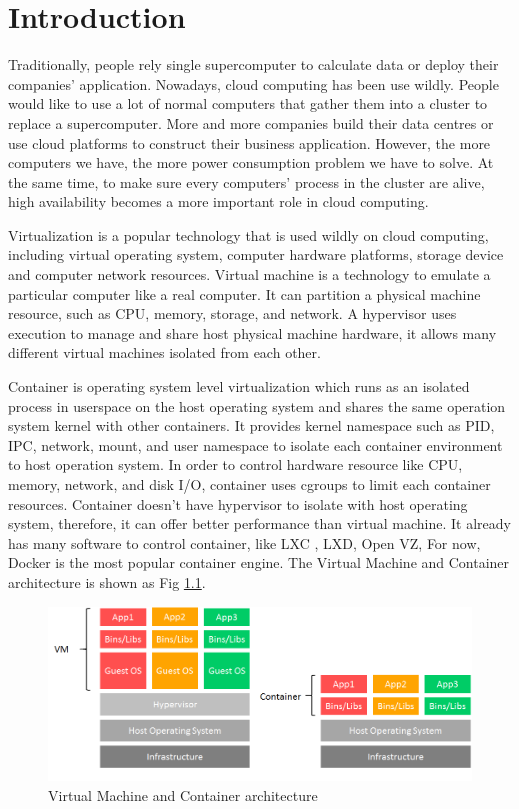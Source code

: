 \chapter{Introduction}
\label{chap:intro}
Traditionally, people rely single supercomputer to calculate data or deploy their companies' application. Nowadays, cloud computing has been use wildly. People would like to use a lot of normal computers that gather them into a cluster to replace a supercomputer. More and more companies build their data centres or use cloud platforms to construct their business application.
However, the more computers we have, the more power consumption problem we have to solve. At the same time, to make sure every computers' process in the cluster are alive, high availability becomes a more important role in cloud computing.

Virtualization is a popular technology that is used wildly on cloud computing,  including virtual operating system, computer hardware platforms, storage device and computer network resources.
Virtual machine is a technology to emulate a particular computer like a real computer. It can partition a physical machine resource, such as CPU, memory, storage, and network.
A hypervisor uses execution to manage and share host physical machine hardware, it allows many different virtual machines isolated from each other.

Container is operating system level virtualization which runs as an isolated process in userspace on the host operating system and shares the same operation system kernel with other containers.
It provides kernel namespace such as PID, IPC, network, mount, and user namespace to isolate each container environment to host operation system.
In order to control hardware resource like CPU, memory, network, and disk I/O, container uses cgroups to limit each container resources.
Container doesn't have hypervisor to isolate with host operating system, therefore, it can offer better performance than virtual machine. It already has many software to control container, like LXC \cite{helsley2009lxc}, LXD, Open VZ, For now, Docker \cite{Docker} is the most popular container engine. The Virtual Machine and Container architecture is shown as Fig \ref{fig:VM_vs_container}.

\begin{figure}[h]
\begin{center}
\includegraphics[width=15cm]{figure/VM_vs_container.png}
\end{center}
\caption{Virtual Machine and Container architecture}
\label{fig:VM_vs_container}
\end{figure}

